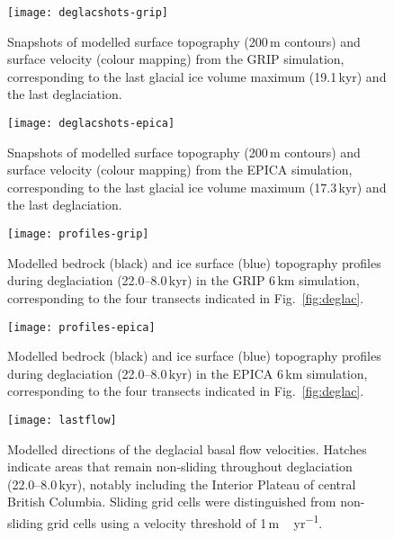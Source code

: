 \documentclass[tc, manuscript]{copernicus}
\begin{document}
\begin{figure*}
  \texttt{[image: deglacshots-grip]}
  \caption{Snapshots of modelled surface topography (200\,m contours)
           and surface velocity (colour mapping) from the GRIP simulation,
           corresponding to the last glacial ice volume maximum (19.1\,kyr) and
           the last deglaciation.}
  \label{fig:deglacshots-grip}
\end{figure*}

\begin{figure*}
  \texttt{[image: deglacshots-epica]}
  \caption{Snapshots of modelled surface topography (200\,m contours)
           and surface velocity (colour mapping) from the EPICA simulation,
           corresponding to the last glacial ice volume maximum (17.3\,kyr) and
           the last deglaciation.}
  \label{fig:deglacshots-epica}
\end{figure*}


\begin{figure}
  \texttt{[image: profiles-grip]}
  \caption{Modelled bedrock (black) and ice surface (blue) topography profiles
           during deglaciation (22.0--8.0\,kyr) in the GRIP 6\,km
           simulation, corresponding to the four transects indicated in
           Fig.~\ref{fig:deglac}.}
  \label{fig:profiles-grip}
\end{figure}

\begin{figure}
  \texttt{[image: profiles-epica]}
  \caption{Modelled bedrock (black) and ice surface (blue) topography profiles
           during deglaciation (22.0--8.0\,kyr) in the EPICA 6\,km
           simulation, corresponding to the four transects indicated in
           Fig.~\ref{fig:deglac}.}
  \label{fig:profiles-epica}
\end{figure}

\begin{figure*}
  \texttt{[image: lastflow]}
  \caption{Modelled directions of the deglacial basal flow velocities. Hatches
           indicate areas that remain non-sliding throughout deglaciation
           (22.0--8.0\,kyr), notably including the Interior Plateau of central
           British Columbia.
           Sliding grid cells were distinguished from non-sliding grid cells
           using a velocity threshold of 1\,\unit{m\,yr^{-1}}.}
  \label{fig:lastflow}
\end{figure*}

\end{document}
